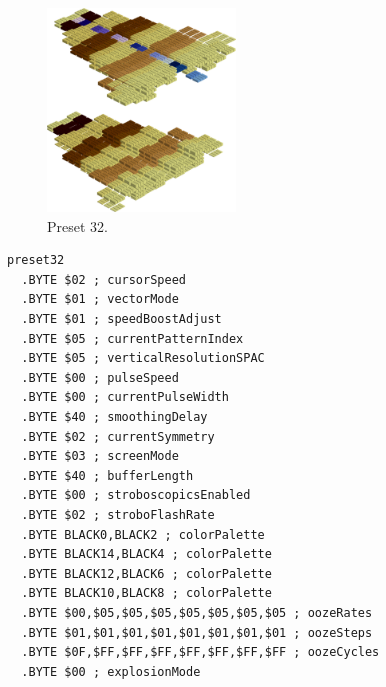 \vspace*{-0.5cm}
\begin{minipage}[b]{0.48\linewidth}
\begin{figure}[H]                                                          
  \centering                                                             
  \begin{adjustbox}{width=5cm,center}                                   
  \includegraphics[width=5cm]{src/colorspace_presets/preset32-45.png}%
  \end{adjustbox}                                                        
\caption*{Preset 32.}                                           
\end{figure}                                                               
\end{minipage}
\hspace{0.1cm}
\begin{minipage}[b]{0.48\linewidth}                                                                         
\begin{lstlisting}[basicstyle=\ttfamily\tiny]
preset32
  .BYTE $02 ; cursorSpeed
  .BYTE $01 ; vectorMode
  .BYTE $01 ; speedBoostAdjust
  .BYTE $05 ; currentPatternIndex
  .BYTE $05 ; verticalResolutionSPAC
  .BYTE $00 ; pulseSpeed
  .BYTE $00 ; currentPulseWidth
  .BYTE $40 ; smoothingDelay
  .BYTE $02 ; currentSymmetry
  .BYTE $03 ; screenMode
  .BYTE $40 ; bufferLength
  .BYTE $00 ; stroboscopicsEnabled
  .BYTE $02 ; stroboFlashRate
  .BYTE BLACK0,BLACK2 ; colorPalette
  .BYTE BLACK14,BLACK4 ; colorPalette
  .BYTE BLACK12,BLACK6 ; colorPalette
  .BYTE BLACK10,BLACK8 ; colorPalette
  .BYTE $00,$05,$05,$05,$05,$05,$05,$05 ; oozeRates
  .BYTE $01,$01,$01,$01,$01,$01,$01,$01 ; oozeSteps
  .BYTE $0F,$FF,$FF,$FF,$FF,$FF,$FF,$FF ; oozeCycles
  .BYTE $00 ; explosionMode
\end{lstlisting}
\end{minipage}


